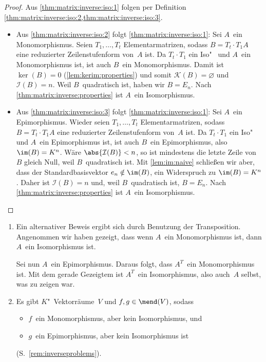 \documentclass[a4paper]{article}
\begin{document}
\begin{proof}
    Aus \cref{thm:matrix:inverse:iso:1} folgen per Definition \cref{thm:matrix:inverse:iso:2,thm:matrix:inverse:iso:3}.
    \begin{itemize}
        \item Aus \cref{thm:matrix:inverse:iso:2} folgt \cref{thm:matrix:inverse:iso:1}: Sei $A$~ein Monomorphismus. Seien $T_1,\dots,T_t$ Elementarmatrizen, sodass $B = T_t\cdot T_1A$ eine reduzierter Zeilenstufenform von~$A$ ist. Da $T_t\cdot T_1$ ein Iso"~ und $A$~ein Monomorphismus ist, ist auch $B$~ein Monomorphismus. Damit ist $\ker(B) = 0$ (\cref{lem:kerim:properties}) und somit $\mathcal{K}(B) = \varnothing$ und $\mathcal{I}(B) = n$. Weil $B$~quadratisch ist, haben wir $B = E_n$. Nach \cref{thm:matrix:inverse:properties} ist $A$~ein Isomorphismus.
        \item Aus \cref{thm:matrix:inverse:iso:3} folgt \cref{thm:matrix:inverse:iso:1}: Sei $A$~ein Epimorphismus. Wieder seien $T_1,\dots,T_t$ Elementarmatrizen, sodass $B = T_t\cdot T_1A$ eine reduzierter Zeilenstufenform von~$A$ ist. Da $T_t\cdot T_1$ ein Iso"~ und $A$~ein Epimorphismus ist, ist auch $B$~ein Epimorphismus, also $\im(B) = K^n$. Wäre $\abs{\mathcal{I}(B)} < n$, so ist mindestens die letzte Zeile von~$B$ gleich Null, weil $B$~quadratisch ist. Mit \cref{lem:im:naive} schließen wir aber, dass der Standardbasisvektor $e_n \notin \im(B)$, ein Widerspruch zu $\im(B) = K^n$. Daher ist $\mathcal{I}(B) = n$ und, weil $B$~quadratisch ist, $B = E_n$. Nach \ref{thm:matrix:inverse:properties} ist $A$~ein Isomorphismus.\qedhere
    \end{itemize}
\end{proof}

\begin{remark}\leavevmode
    \begin{enumerate}
        \item Ein alternativer Beweis ergibt sich durch Benutzung der Transposition. Angenommen wir haben gezeigt, dass wenn $A$~ein Monomorphismus ist, dann $A$~ein Isomorphismus ist.

              Sei nun $A$~ein Epimorphismus. Daraus folgt, dass $A^T$~ein Monomorphismus ist. Mit dem gerade Gezeigtem ist $A^T$~ein Isomorphismus, also auch~$A$ selbst, was zu zeigen war.
        \item Es gibt $K$"~Vektorräume~$V$ und $f,g \in \mend(V)$, sodass
              \begin{itemize}
                  \item $f$~ein Monomorphismus, aber kein Isomorphismus, und
                  \item $g$~ein Epimorphismus, aber kein Isomorphismus ist
              \end{itemize}
              (S.~\cref{rem:inverseproblems}).
    \end{enumerate}
\end{remark}
\end{document}
